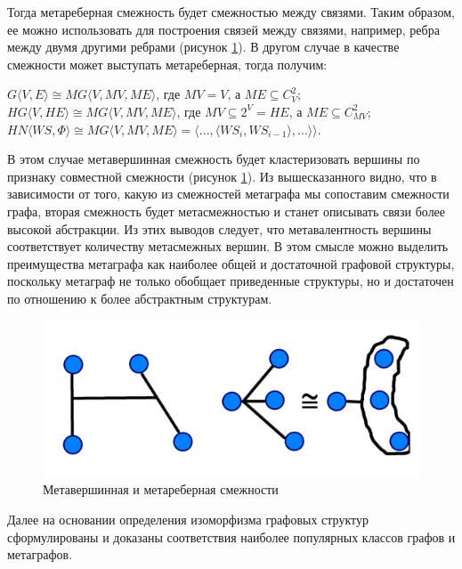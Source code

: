 Тогда метареберная смежность будет смежностью между связями. Таким образом, ее можно использовать для построения связей между связями, например, ребра между двумя другими ребрами (рисунок \ref{fig:imgMVAMEA}).
В другом случае в качестве смежности может выступать метареберная, тогда получим:
\vspace{-0.6cm}
\begin{center}
	$G\langle V, E \rangle \cong MG \langle V, MV, ME \rangle$, где $MV = V$, а $ME \subseteq C_V^2$;
	$HG\langle V, HE \rangle \cong MG \langle V, MV, ME \rangle$, где $MV \subseteq 2^V = HE$, а $ME \subseteq C_{MV}^{2}$;
	$HN\langle WS, \Phi \rangle \cong MG \langle V, MV, ME \rangle=\big\langle ..., \langle WS_i , WS_{i-1}\rangle, ... \big\rangle \Big\rangle$.
\end{center}

В этом случае метавершинная смежность будет кластеризовать вершины по признаку совместной смежности (рисунок \ref{fig:imgMVAMEA}).
Из вышесказанного видно, что в зависимости от того, какую из смежностей метаграфа мы сопоставим смежности графа, вторая смежность будет метасмежностью и станет описывать связи более высокой абстракции. Из этих выводов следует, что метавалентность вершины соответствует количеству метасмежных вершин. В этом смысле можно выделить преимущества метаграфа как наиболее общей и достаточной графовой структуры, поскольку метаграф не только обобщает приведенные структуры, но и достаточен по отношению к более абстрактным структурам. 

\begin{figure}[h!]
    \begin{center}
        \includegraphics[scale=0.3]{Images/exampleadj.png}
    \end{center}
    \caption{Метавершинная и метареберная смежности}
    \label{fig:imgMVAMEA}

\end{figure}

Далее на основании определения изоморфизма графовых структур сформулированы и доказаны соответствия наиболее популярных классов графов и метаграфов.

